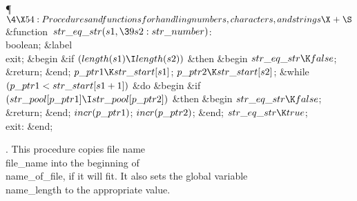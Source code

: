 \Y\P$\4\X54:Procedures and functions for handling numbers, characters, and
strings\X\mathrel{+}\S$\6
\4\&{function}\1\  $\\{str\_eq\_str}(\\{s1},\39\\{s2}:\\{str\_number})$: %
\\{boolean};\6
\4\&{label} \\{exit};\2\6
\&{begin} \&{if} $(\\{length}(\\{s1})\I\\{length}(\\{s2}))$ \1\&{then}\6
\&{begin} $\\{str\_eq\_str}\K\\{false}$;\5
\&{return};\6
\&{end};\2\6
$\\{p\_ptr1}\K\\{str\_start}[\\{s1}]$;\5
$\\{p\_ptr2}\K\\{str\_start}[\\{s2}]$;\6
\&{while} $(\\{p\_ptr1}<\\{str\_start}[\\{s1}+1])$ \1\&{do}\6
\&{begin} \&{if} $(\\{str\_pool}[\\{p\_ptr1}]\I\\{str\_pool}[\\{p\_ptr2}])$ %
\1\&{then}\6
\&{begin} $\\{str\_eq\_str}\K\\{false}$;\5
\&{return};\6
\&{end};\2\6
$\\{incr}(\\{p\_ptr1})$;\5
$\\{incr}(\\{p\_ptr2})$;\6
\&{end};\2\6
$\\{str\_eq\_str}\K\\{true}$;\6
\4\\{exit}: \&{end};\par
\fi

.
This procedure copies file name \\{file\_name} into the beginning of
\\{name\_of\_file}, if it will fit.  It also sets the global variable
\\{name\_length} to the appropriate value.


